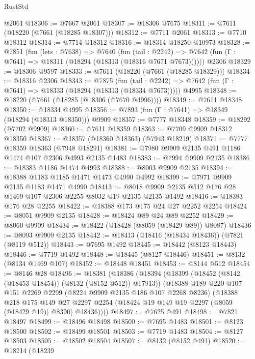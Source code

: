 \begin{lexlean}{RustStd}
\begin{coremodule}
{\begin{coremodule}
{{{{{{{{{{{{{{{{{{{{{{{{{{{{{{{{{{    @2061
@18306 := @7667 @2061
@18307 := @18306 @7675
@18311 := @7611 (@18220 (@7661 (@18285 @18307)))
@18312 := @7711 @2061
@18313 := @7710 @18312
@18314 := @7714 @18312
@18316 := @18314 @18250 @10973
@18328 := @7851
    (fun (lets : @7638) =>
    @7640
      (fun (tail : @2242) =>
      @7642 (fun (Γ : @7641) => @18311 (@18294 (@18313 (@18316 @7671 @7673))))))
    @2306
@18329 := @18306 @9597
@18333 := @7611 (@18220 (@7661 (@18285 @18329)))
@18334 := @18316 @2306
@18343 := @7875
    (fun (tail : @2242) => @7642 (fun (Γ : @7641) => @18333 (@18294 (@18313 (@18334 @7673)))))
    @4995
@18348 := @18220 (@7661 (@18285 (@18306 (@7670 @4996))))
@18349 := @7611 @18348
@18350 := @18334 @4995
@18356 := @7893 (fun (Γ : @7641) => @18349 (@18294 (@18313 @18350))) @9909
@18357 := @7777 @18348
@18359 := @18292 (@7702 @9909)
@18360 := @7611 @18359
@18363 := @7709 @9909 @18312 @18350
@18367 := @18357 (@18360 @18363) (@7943 @18219)
@18371 := @7777 @18359 @18363 (@7948 @18291)
@18381 := @7980 @9909 @2135 @491 @1186 @1474 @107 @2306 @4993 @2135 @1483
@18383 := @7994 @9909 @2135
@18386 := @18383 @1186 @1474 @4993
@18388 := @8003 @9909 @2135
@18394 := @18388 @1183 @1185 @1471 @1473 @4990 @4992
@18399 := @7971 @9909 @2135 @1183 @1471 @4990
@18413 := @8018 @9909 @2135 @512 @176 @28 @1469 @107 @2306 @2255 @8032 @19 @2135 @2135 @1492
@18416 := @18383 @176 @28 @2255
@18422 := @18388 @173 @175 @24 @27 @2252 @2254
@18424 := @8051 @9909 @2135
@18428 := @18424 @89 @24 @89 @2252
@18429 := @8060 @9909
@18434 := @18422 (@18428 (@8059 (@18429 @89)) @8087)
@18436 := @8093 @9909 @2135
@18442 := @18413 (@18416 (@18434 @18436)) (@7821 (@8119 @512))
@18443 := @7695 @1492
@18445 := @18442 (@8123 @18443)
@18446 := @7719 @1492
@18448 := @18445 (@8127 @18446)
@18451 := @8132 (@8134 @1469 @107)
@18452 := @18448 @18451
@18453 := @8144 @512
@18454 := @8146 @28
@18496 := @18381
    (@18386
      (@18394
        (@18399 (@18452 (@8142 (@18453 @18454)) (@8132 (@8152 @512)) @17913))
        (@18388
          @189
          @220
          @107
          @151
          @2269
          @2299
          (@8224 @9909 @2135 @186 @107 @2268 @8236)
          (@18388
            @218
            @175
            @149
            @27
            @2297
            @2254
            (@18424 @19 @149 @19 @2297 (@8059 (@18429 @19)) @8390)
            @18436))))
@18497 := @7625 @491
@18498 := @7821 @18497
@18499 := @18496 @18498
@18500 := @7695 @1483
@18501 := @8123 @18500
@18502 := @18499 @18501
@18503 := @7719 @1483
@18504 := @8127 @18503
@18505 := @18502 @18504
@18507 := @8132 (@8152 @491)
@18520 := @18214
    (@18239
}}}}}}}}}}}}}}}}}}}}}}}}}}}}}}}}}}
\end{coremodule}}
\end{coremodule}
\end{lexlean}
